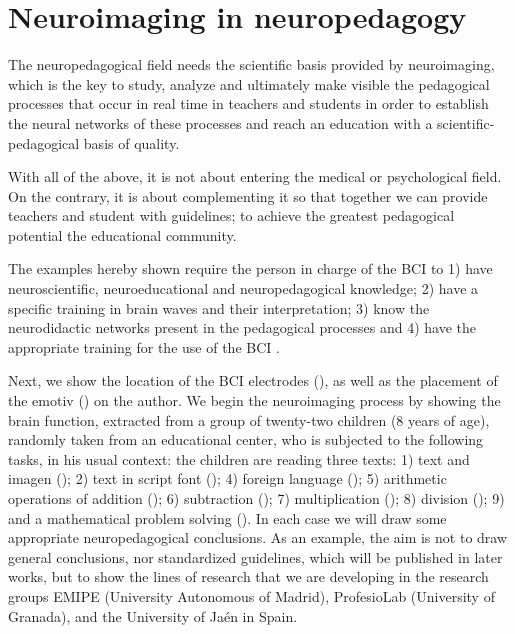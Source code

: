 \documentclass[english]{textolivre}
\begin{document}
\section{Neuroimaging in neuropedagogy}\label{sec-fmt-manuscrito}
The neuropedagogical field needs the scientific basis provided by neuroimaging, which is the key to study, analyze and ultimately make visible the pedagogical processes that occur in real time in teachers and students in order to establish the neural networks of these processes and reach an education with a scientific-pedagogical basis of quality.

With all of the above, it is not about entering the medical or psychological field. On the contrary, it is about complementing it so that together we can provide teachers and student with guidelines; to achieve the greatest pedagogical potential the educational community.

The examples hereby shown require the person in charge of the BCI to 1) have neuroscientific, neuroeducational and neuropedagogical knowledge; 2) have a specific training in brain waves and their interpretation; 3) know the neurodidactic networks present in the pedagogical processes and 4) have the appropriate training for the use of the BCI \cite{hernandez_neuroimagen_2022}.

Next, we show the location of the BCI electrodes (), as well as the placement of the emotiv () on the author. We begin the neuroimaging process by showing the brain function, extracted from a group of twenty-two children (8 years of age), randomly taken from an educational center, who is subjected to the following tasks, in his usual context: the children are reading three texts: 1) text and imagen (); 2) text in script font (); 4) foreign language (); 5) arithmetic operations of addition (); 6) subtraction (); 7) multiplication (); 8) division (); 9) and a mathematical problem solving (). In each case we will draw some appropriate neuropedagogical conclusions. As an example, the aim is not to draw general conclusions, nor standardized guidelines, which will be published in later works, but to show the lines of research that we are developing in the research groups EMIPE (University Autonomous of Madrid), ProfesioLab (University of Granada), and the University of Jaén in Spain.
\end{document}
